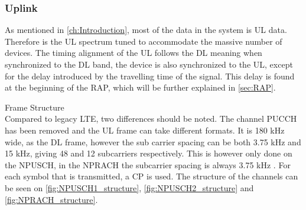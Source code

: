 \subsubsection{Uplink}
\label{sec:ULphy}
As mentioned in \autoref{ch:Introduction}, most of the data in the system is \gls{UL} data. Therefore is the \gls{UL} spectrum tuned to accommodate the massive number of devices. The timing alignment of the \gls{UL} follows the \gls{DL} meaning when synchronized to the \gls{DL} band, the device is also synchronized to the \gls{UL}, except for the delay introduced by the travelling time of the signal. This delay is found at the beginning of the \gls{RAP}, which will be further explained in \autoref{sec:RAP}. 

Frame Structure\\
Compared to legacy \gls{LTE}, two differences should be noted. The channel \gls{PUCCH} has been removed and the \gls{UL} frame can take different formats. It is 180 kHz wide, as the \gls{DL} frame, however the sub carrier spacing can be both 3.75 kHz and 15 kHz, giving 48 and 12 subcarriers respectively. This is however only done on the \gls{NPUSCH}, in the \gls{NPRACH} the subcarrier spacing is always 3.75 kHz \citep{NB-IoT_Book}. For each symbol that is transmitted, a \gls{CP} is used. The structure of the channels can be seen on \autoref{fig:NPUSCH1_structure}, \autoref{fig:NPUSCH2_structure} and \autoref{fig:NPRACH_structure}.

